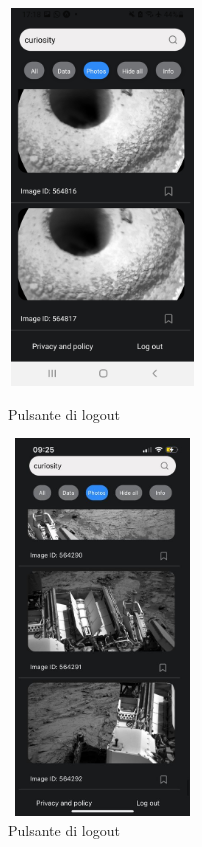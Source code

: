 \begin{figure}[H]
    \begin{minipage}[h]{0.47\textwidth}
        \centering
        \includegraphics[width=5cm, height=10cm]{images/immaginiAndroid/logout.jpg}
        \caption{\label{logoutAndroid} Pulsante di logout}
    \end{minipage}
    \hfill
    \begin{minipage}[h]{0.47\textwidth}
        \centering
        \includegraphics[width=5cm, height=10cm]{images/immaginiPhone/logout.jpeg}
        \caption{\label{logoutIphone} Pulsante di logout}
    \end{minipage}
\end{figure}